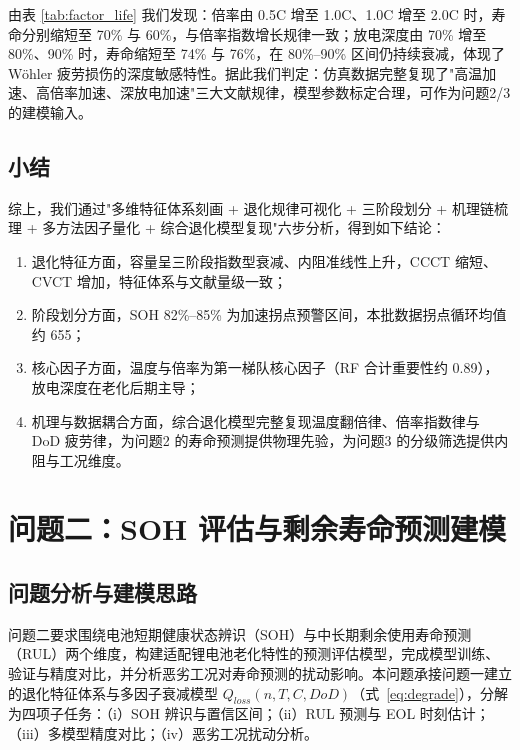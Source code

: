 \documentclass[withoutpreface]{cumcmthesis}
\begin{document}
由表 \ref{tab:factor_life} 我们发现：倍率由 0.5C 增至 1.0C、1.0C 增至 2.0C 时，寿命分别缩短至 70\% 与 60\%，与倍率指数增长规律一致；放电深度由 70\% 增至 80\%、90\% 时，寿命缩短至 74\% 与 76\%，在 80\%--90\% 区间仍持续衰减，体现了 Wöhler 疲劳损伤的深度敏感特性。据此我们判定：仿真数据完整复现了"高温加速、高倍率加速、深放电加速"三大文献规律，模型参数标定合理，可作为问题2/3 的建模输入。

\subsection{小结}
综上，我们通过"多维特征体系刻画 + 退化规律可视化 + 三阶段划分 + 机理链梳理 + 多方法因子量化 + 综合退化模型复现"六步分析，得到如下结论：
\begin{enumerate}
\item 退化特征方面，容量呈三阶段指数型衰减、内阻准线性上升，CCCT 缩短、CVCT 增加，特征体系与文献量级一致；
\item 阶段划分方面，SOH 82\%--85\% 为加速拐点预警区间，本批数据拐点循环均值约 655；
\item 核心因子方面，温度与倍率为第一梯队核心因子（RF 合计重要性约 0.89），放电深度在老化后期主导；
\item 机理与数据耦合方面，综合退化模型完整复现温度翻倍律、倍率指数律与 DoD 疲劳律，为问题2 的寿命预测提供物理先验，为问题3 的分级筛选提供内阻与工况维度。
\end{enumerate}

\newpage

\section{问题二：SOH 评估与剩余寿命预测建模}
\label{sec:q2}

\subsection{问题分析与建模思路}
\label{sec:q2_overview}

问题二要求围绕电池短期健康状态辨识（SOH）与中长期剩余使用寿命预测（RUL）两个维度，构建适配锂电池老化特性的预测评估模型，完成模型训练、验证与精度对比，并分析恶劣工况对寿命预测的扰动影响。本问题承接问题一建立的退化特征体系与多因子衰减模型 $Q_{loss}(n,T,C,DoD)$（式~\eqref{eq:degrade}），分解为四项子任务：（i）SOH 辨识与置信区间；（ii）RUL 预测与 EOL 时刻估计；（iii）多模型精度对比；（iv）恶劣工况扰动分析。
\end{document}
